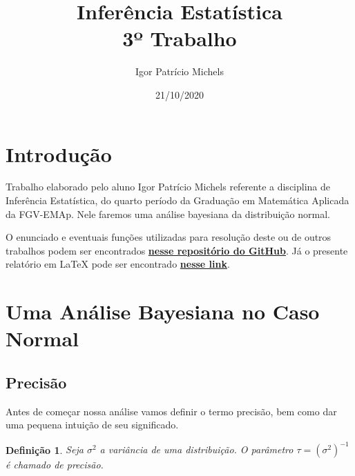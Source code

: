 \documentclass{article}
\title{Inferência Estatística \\ 3º Trabalho}
\author{Igor Patrício Michels}
\date{21/10/2020}
\newtheorem{definition}{Definição}
\begin{document}
\maketitle

\section*{Introdução}

Trabalho elaborado pelo aluno Igor Patrício Michels referente a disciplina de Inferência Estatística, do quarto período da Graduação em Matemática Aplicada da FGV-EMAp. Nele faremos uma análise bayesiana da distribuição normal.

O enunciado e eventuais funções utilizadas para resolução deste ou de outros trabalhos podem ser encontrados \href{https://github.com/IgorMichels/Statistical_Inference}{\textbf{nesse repositório do GitHub}}. Já o presente relatório em \LaTeX{} pode ser encontrado \href{https://www.overleaf.com/read/sdfnbcnthrms}{\textbf{nesse link}}.

\section*{Uma Análise Bayesiana no Caso Normal}

\subsection*{Precisão}

Antes de começar nossa análise vamos definir o termo precisão, bem como dar uma pequena intuição de seu significado.

\begin{definition}
    Seja $\sigma^2$ a variância de uma distribuição. O parâmetro $\tau = \left(\sigma^2\right)^{-1}$ é chamado de precisão.
\end{definition}
\end{document}
